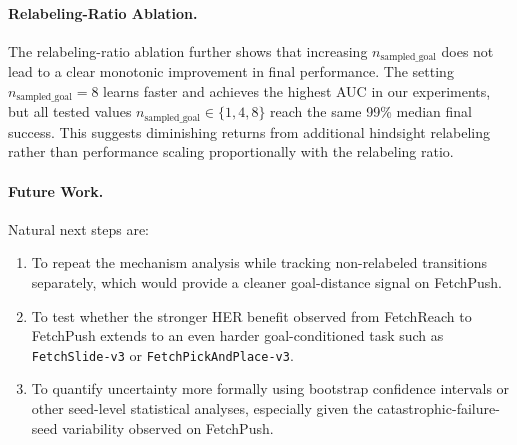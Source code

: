 \documentclass{article}
\begin{document}
\paragraph{Relabeling-Ratio Ablation.}
The relabeling-ratio ablation further shows that increasing
$n_{\text{sampled\_goal}}$ does not lead to a clear monotonic improvement in
final performance. The setting $n_{\text{sampled\_goal}}=8$ learns faster and
achieves the highest AUC in our experiments, but all tested values
$n_{\text{sampled\_goal}}\in\{1,4,8\}$ reach the same 99\% median final
success. This suggests diminishing returns from additional hindsight relabeling
rather than performance scaling proportionally with the relabeling ratio.

\paragraph{Future Work.}
Natural next steps are:

\begin{enumerate}
    \item To repeat the mechanism analysis while tracking non-relabeled
    transitions separately, which would provide a cleaner goal-distance signal
    on FetchPush.

    \item To test whether the stronger HER benefit observed from FetchReach to
    FetchPush extends to an even harder goal-conditioned task such as
    \texttt{FetchSlide-v3} or \texttt{FetchPickAndPlace-v3}.

    \item To quantify uncertainty more formally using bootstrap confidence
    intervals or other seed-level statistical analyses, especially given the
    catastrophic-failure-seed variability observed on FetchPush.
\end{enumerate}
\end{document}
